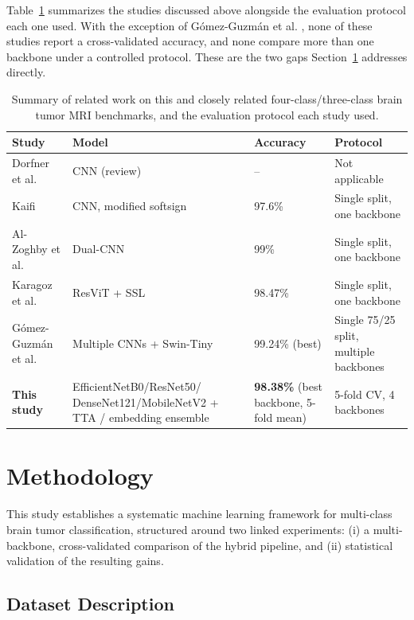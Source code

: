 \documentclass[11pt]{article}
\begin{document}
Table~\ref{tab:related_work} summarizes the studies discussed above alongside the evaluation protocol each one used. With the exception of G\'omez-Guzm\'an et al. \cite{gomezguzman2025swin}, none of these studies report a cross-validated accuracy, and none compare more than one backbone under a controlled protocol. These are the two gaps Section~\ref{sec:methodology} addresses directly.

\begin{table}[htbp]
\centering
\caption{Summary of related work on this and closely related four-class/three-class brain tumor MRI benchmarks, and the evaluation protocol each study used.}
\label{tab:related_work}
\small
\begin{tabular}{@{}p{2.6cm}p{3.2cm}p{1.6cm}p{3.4cm}@{}}
\toprule
\textbf{Study} & \textbf{Model} & \textbf{Accuracy} & \textbf{Protocol} \\
\midrule
Dorfner et al. \cite{dorfner2025review} & CNN (review) & -- & Not applicable \\
Kaifi \cite{kaifi2024enhancing} & CNN, modified softsign & 97.6\% & Single split, one backbone \\
Al-Zoghby et al. \cite{alzoghby2023dual} & Dual-CNN & 99\% & Single split, one backbone \\
Karagoz et al. \cite{karagoz2024resvit} & ResViT + SSL & 98.47\% & Single split, one backbone \\
G\'omez-Guzm\'an et al. \cite{gomezguzman2025swin} & Multiple CNNs + Swin-Tiny & 99.24\% (best) & Single 75/25 split, multiple backbones \\
\textbf{This study} & EfficientNetB0/ResNet50/ DenseNet121/MobileNetV2 + TTA / embedding ensemble & \textbf{98.38\%} (best backbone, 5-fold mean) & 5-fold CV, 4 backbones \\
\bottomrule
\end{tabular}
\end{table}


\section{Methodology}
\label{sec:methodology}

This study establishes a systematic machine learning framework for multi-class brain tumor classification, structured around two linked experiments: (i) a multi-backbone, cross-validated comparison of the hybrid pipeline, and (ii) statistical validation of the resulting gains.

\subsection{Dataset Description}
\label{sec:datasets}
\end{document}
